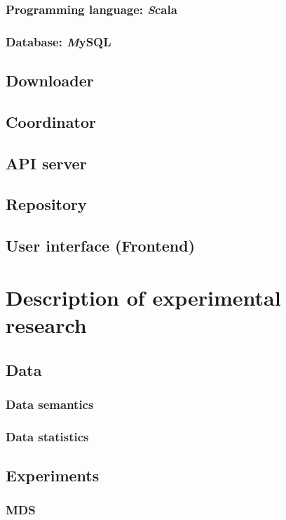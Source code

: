 \documentclass[a4paper,12pt]{article}
\begin{document}
    \subsubsection{Programming language: {\textit Scala}}
    \subsubsection{Database: {\textit MySQL}}
    \subsection{Downloader}
    \subsection{Coordinator}
    \subsection{API server}
    \subsection{Repository}
    \subsection{User interface (Frontend)}
    
    \section{Description of experimental research}
    
    \subsection{Data}
    \subsubsection{Data semantics}
    \subsubsection{Data statistics}
   	\subsection{Experiments}
   	\subsubsection{MDS}
\end{document}
